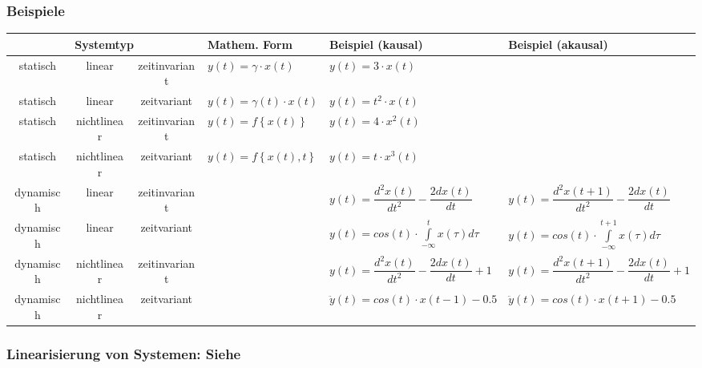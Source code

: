 		
		\subsubsection{Beispiele }

			\bgroup
			\setlength{\tabcolsep}{1.3mm}
			\begin{tabularx}{\textwidth}{|c|c|c|l|l|X|}
			\hline
				\multicolumn{3}{|c|}{\textbf{Systemtyp}}
			&	\textbf{Mathem. Form}
			&	\textbf{Beispiel (kausal)}
			&	\textbf{Beispiel (akausal)}
			\\ \hline
				statisch
			&	linear
			&	zeitinvariant
			&	$y(t) = \gamma \cdot x(t)$
			&	$y(t) = 3 \cdot x(t)$
			&	
			\\ \hline
				statisch
			&	linear
			&	zeitvariant
			&	$y(t) = \gamma(t) \cdot x(t)$
			&	$y(t) = t^2 \cdot x(t)$
			&	
			\\ \hline
				statisch
			&	nichtlinear
			&	zeitinvariant
			&	$y(t) = f \left\lbrace  x(t) \right\rbrace $
			&	$y(t) = 4 \cdot x^2(t)$
			&	
			\\ \hline
				statisch
			&	nichtlinear
			&	zeitvariant
			&	$y(t) = f \left\lbrace  x(t),t \right\rbrace $
			&	$y(t) = t \cdot x^3(t)$
			&	
			\\ \hline
				dynamisch
			&	linear
			&	zeitinvariant
			&	
			&	$y(t) = \dfrac{d^2 x(t)}{d t^2} - \dfrac{2 dx(t)}{dt}$
			&	$y(t) = \dfrac{d^2 x(t+1)}{d t^2} - \dfrac{2 dx(t)}{dt}$
			\\ \hline
				dynamisch
			&	linear
			&	zeitvariant
			&	
			&	$y(t) = cos(t) \cdot \int\limits_{-\infty}^{t} x(\tau) d\tau $
			&	$y(t) = cos(t) \cdot \int\limits_{-\infty}^{t+1} x(\tau) d\tau $
			\\ \hline
				dynamisch
			&	nichtlinear
			&	zeitinvariant
			&	
			&	$y(t) = \dfrac{d^2 x(t)}{d t^2} - \dfrac{2 dx(t)}{dt} + 1$
			&	$y(t) = \dfrac{d^2 x(t+1)}{d t^2} - \dfrac{2 dx(t)}{dt} + 1$
			\\ \hline
				dynamisch
			&	nichtlinear
			&	zeitvariant
			&	
			&	$ \ddot y(t) = cos(t) \cdot x(t-1) - 0.5$
			&	$ \ddot y(t) = cos(t) \cdot x(t+1) - 0.5$
			\\ \hline
			\end{tabularx}
			\egroup
			
			
	\subsubsection{Linearisierung von Systemen: Siehe }

